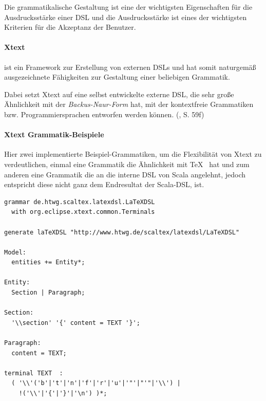 Die grammatikalische Gestaltung ist eine der wichtigsten Eigenschaften
für die Ausdrucksstärke einer DSL und die Ausdrucksstärke ist eines
der wichtigsten Kriterien für die Akzeptanz der Benutzer.

\paragraph{Xtext} ist ein Framework zur Erstellung von externen DSLs und
hat somit naturgemäß ausgezeichnete Fähigkeiten zur Gestaltung einer beliebigen
Grammatik.

Dabei setzt Xtext auf eine selbst entwickelte externe DSL, die sehr große
Ähnlichkeit mit der \emph{Backus-Naur-Form} hat, mit der kontextfreie
Grammatiken bzw. Programmiersprachen entworfen werden können.
(\cite{xtext}, S. 59f)

\paragraph{Xtext Grammatik-Beispiele}

Hier zwei implementierte Beispiel-Grammatiken, um die Flexibilität von
Xtext zu verdeutlichen, einmal eine Grammatik die Ähnlichkeit mit \TeX~
hat und zum anderen eine Grammatik die an die interne DSL von Scala angelehnt,
jedoch entspricht diese nicht ganz dem Endresultat der Scala-DSL, ist.

\begin{lstlisting}[caption=\TeX-ähnliches Xtext-Grammatik-Snippet.]
grammar de.htwg.scaltex.latexdsl.LaTeXDSL
  with org.eclipse.xtext.common.Terminals

generate laTeXDSL "http://www.htwg.de/scaltex/latexdsl/LaTeXDSL"

Model:
  entities += Entity*;

Entity:
  Section | Paragraph;

Section:
  '\\section' '{' content = TEXT '}';

Paragraph:
  content = TEXT;

terminal TEXT  : 
  ( '\\'('b'|'t'|'n'|'f'|'r'|'u'|'"'|"'"|'\\') |
    !('\\'|'{'|'}'|'\n') )*;
\end{lstlisting}

